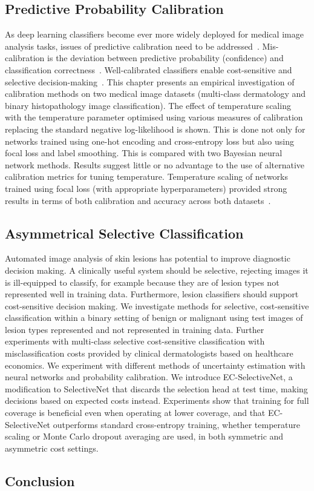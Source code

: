 \subsection*{Predictive Probability Calibration}
As deep learning classifiers become ever more widely deployed for medical image analysis tasks, issues of predictive calibration need to be addressed~\citep{maron2019systematic}. Mis-calibration is the deviation between predictive probability (confidence) and classification correctness~\citep{guo2017calibration}. Well-calibrated classifiers enable cost-sensitive and selective decision-making~\citep{carse2021robust}. This chapter presents an empirical investigation of calibration methods on two medical image datasets (multi-class dermatology and binary histopathology image classification). The effect of temperature scaling with the temperature parameter optimised using various measures of calibration replacing the standard negative log-likelihood is shown. This is done not only for networks trained using one-hot encoding and cross-entropy loss but also using focal loss and label smoothing. This is compared with two Bayesian neural network methods. Results suggest little or no advantage to the use of alternative calibration metrics for tuning temperature. Temperature scaling of networks trained using focal loss (with appropriate hyperparameters) provided strong results in terms of both calibration and accuracy across both datasets~\citep{carse2022calibration}.

\subsection*{Asymmetrical Selective Classification}
Automated image analysis of skin lesions has potential to improve diagnostic decision making. A clinically useful system should be selective, rejecting images it is ill-equipped to classify, for example because they are of lesion types not represented well in training data. Furthermore, lesion classifiers should support cost-sensitive decision making. We investigate methods for selective, cost-sensitive classification within a binary setting of benign or malignant using test images of lesion types represented and not represented in training data. Further experiments with multi-class selective cost-sensitive classification with misclassification costs provided by clinical dermatologists based on healthcare economics. We experiment with different methods of uncertainty estimation with neural networks and probability calibration.
We introduce EC-SelectiveNet, a modification to SelectiveNet that discards the selection head at test time, making decisions based on expected costs instead. Experiments show that training for full coverage is beneficial even when operating at lower coverage, and that EC-SelectiveNet outperforms standard cross-entropy training, whether temperature scaling or Monte Carlo dropout averaging are used, in both symmetric and asymmetric cost settings.

\subsection*{Conclusion}
